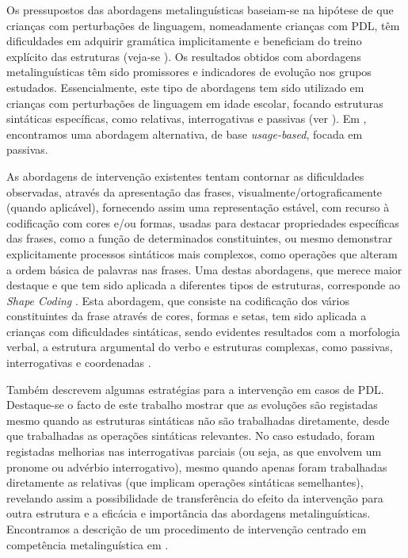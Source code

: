 \documentclass[output=paper,colorlinks,citecolor=brown,booklanguage=portuguese]{langscibook}
\begin{document}
Os pressupostos das abordagens metalinguísticas baseiam-se na hipótese de que crianças com perturbações de linguagem, nomeadamente crianças com PDL, têm dificuldades em adquirir gramática implicitamente e beneficiam do treino explícito das estruturas (veja-se \citealp{Ebbels2014}). Os resultados obtidos com abordagens metalinguísticas têm sido promissores e indicadores de evolução nos grupos estudados. Essencialmente, este tipo de abordagens tem sido utilizado em crianças com perturbações de linguagem em idade escolar, focando estruturas sintáticas específicas, como relativas, interrogativas e passivas (ver \citealp{Levy2009, Ebbels2010}). Em \citet{Riches2013}, encontramos uma abordagem alternativa, de base \emph{usage-based}, focada em passivas.

As abordagens de intervenção existentes tentam contornar as dificuldades observadas, através da apresentação das frases, visualmente/ortograficamente (qu\-ando aplicável), fornecendo assim uma representação estável, com recurso à codificação com cores e/ou formas, usadas para destacar propriedades específicas das frases, como a função de determinados constituintes, ou mesmo demonstrar explicitamente processos sintáticos mais complexos, como operações que alteram a ordem básica de palavras nas frases. Uma destas abordagens, que merece maior destaque e que tem sido aplicada a diferentes tipos de estruturas, corresponde ao \emph{Shape Coding} \citep{Ebbels2017}. Esta abordagem, que consiste na codificação dos vários constituintes da frase através de cores, formas e setas, tem sido aplicada a crianças com dificuldades sintáticas, sendo evidentes resultados com a morfologia verbal, a estrutura argumental do verbo e estruturas complexas, como passivas, interrogativas e coordenadas \citep{Ebbels2008, Ebbels2014}. 

Também \citet{Levy2009} descrevem algumas estratégias para a intervenção em casos de PDL. Destaque-se o facto de este trabalho mostrar que as evoluções são registadas mesmo quando as estruturas sintáticas não são trabalhadas diretamente, desde que trabalhadas as operações sintáticas relevantes. No caso estudado, foram registadas melhorias nas interrogativas parciais (ou seja, as que envolvem um pronome ou advérbio interrogativo), mesmo quando apenas foram trabalhadas diretamente as relativas (que implicam operações sintáticas semelhantes), revelando assim a possibilidade de transferência do efeito da intervenção para outra estrutura e a eficácia e importância das abordagens metalinguísticas. Encontramos a descrição de um procedimento de intervenção centrado em competência metalinguística em .
\end{document}
